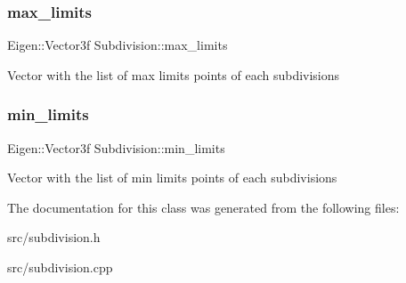 \subsubsection{\texorpdfstring{max\+\_\+limits}{max\_limits}}
{\footnotesize\ttfamily Eigen\+::\+Vector3f Subdivision\+::max\+\_\+limits}

Vector with the list of max limits points of each subdivisions \mbox{\label{class_subdivision_ac8d84e208bb294b78379a05da4ccfc37}} 
\subsubsection{\texorpdfstring{min\+\_\+limits}{min\_limits}}
{\footnotesize\ttfamily Eigen\+::\+Vector3f Subdivision\+::min\+\_\+limits}

Vector with the list of min limits points of each subdivisions 

The documentation for this class was generated from the following files\+:\begin{DoxyCompactItemize}
\item 
src/subdivision.\+h\item 
src/subdivision.\+cpp\end{DoxyCompactItemize}
